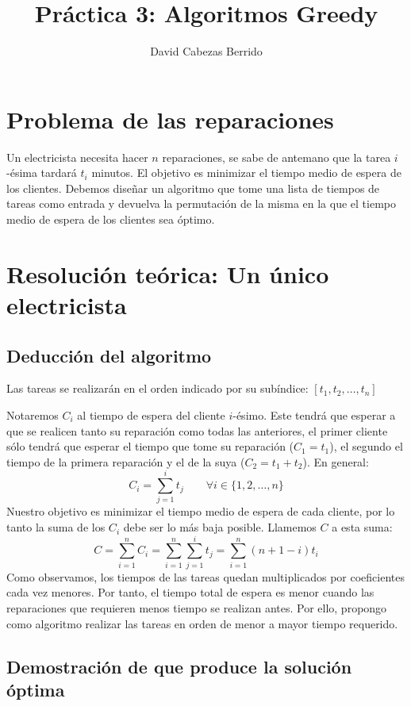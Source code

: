 \documentclass[a4]{article}
\author{David Cabezas Berrido}
\date{\vspace{-5mm}}
\title{\huge Práctica 3: Algoritmos Greedy \HRule\vspace{-4mm}}
\begin{document}
\maketitle
\vspace{20mm}
\tableofcontents
\newpage

\section{Problema de las reparaciones}
Un electricista necesita hacer $n$ reparaciones, se sabe de antemano
que la tarea $i$-ésima tardará $t_i$ minutos. El objetivo es minimizar
el tiempo medio de espera de los clientes. Debemos diseñar un
algoritmo que tome una lista de tiempos de tareas como entrada y
devuelva la permutación de la misma en la que el tiempo medio de
espera de los clientes sea óptimo.

\section{Resolución teórica: Un único electricista}

\subsection{Deducción del algoritmo}

Las tareas se realizarán en el orden indicado por su subíndice:
$[t_1, t_2,\ldots,t_n]$

Notaremos $C_i$ al tiempo de espera del cliente $i$-ésimo. Este tendrá
que esperar a que se realicen tanto su reparación como todas las
anteriores, el primer cliente sólo tendrá que esperar el tiempo que
tome su reparación ($C_1=t_1$), el segundo el tiempo de la primera
reparación y el de la suya ($C_2=t_1+t_2$). En general:
\[C_i=\sum_{j=1}^it_j \qquad \forall i \in \{1,2,\ldots,n\}\]
Nuestro objetivo es minimizar el tiempo medio de espera de cada
cliente, por lo tanto la suma de los $C_i$ debe ser lo más baja
posible. Llamemos $C$ a esta suma:
\[C = \sum_{i=1}^n C_i = \sum_{i=1}^n \sum_{j=1}^i t_j =
  \sum_{i=1}^n(n+1-i)t_i\]
Como observamos, los tiempos de las tareas quedan multiplicados por
coeficientes cada vez menores. Por tanto, el tiempo total de espera es
menor cuando las reparaciones que requieren menos tiempo se realizan
antes. Por ello, propongo como algoritmo realizar las tareas en orden
de menor a mayor tiempo requerido.

\subsection{Demostración de que produce la solución óptima}
\end{document}
